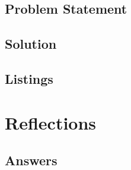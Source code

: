 \documentclass[12pt,a4paper,titlepage,oneside]{article}
\begin{document}
\subsection{Problem Statement}


\subsection{Solution}

\subsection{Listings}

\newpage
\section{Reflections}



\subsection{Answers}
\end{document}
